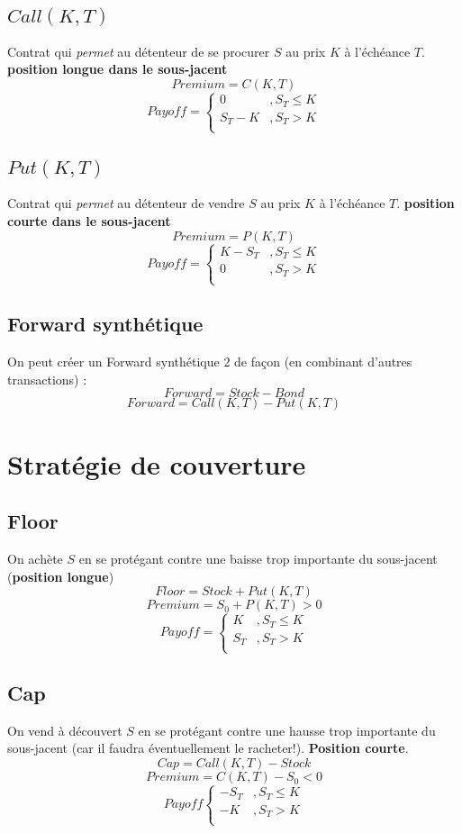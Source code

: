 \documentclass[10pt, french]{article}
\begin{document}
\begin{multicols*}{2}
\subsection*{$Call(K,T)$}
Contrat qui \textit{permet} au détenteur de se procurer $S$ au prix $K$ à l'échéance $T$. \textbf{position longue dans le sous-jacent}
\[Premium = C(K,T) \]
\[Payoff =
\begin{cases}
0				& , S_T \leq K \\
S_T - K		& , S_T > K \\
\end{cases}
\]



\subsection*{$Put(K,T)$}
Contrat qui \textit{permet} au détenteur de vendre $S$ au prix $K$ à l'échéance $T$. \textbf{position courte dans le sous-jacent}
\[Premium = P(K,T)\]
\[Payoff = 
\begin{cases}
K - S_T			& , S_T \leq K \\
0					& , S_T > K \\
\end{cases}
\]


\subsection*{Forward synthétique}
On peut créer un Forward synthétique 2 de façon (en combinant d'autres transactions) : 
\[Forward = Stock - Bond \]
\[Forward = Call(K,T) - Put(K,T) \]



\section{Stratégie de couverture}
\subsection*{Floor}
On achète $S$ en se protégant contre une baisse trop importante du sous-jacent (\textbf{position longue})
\[Floor = Stock + Put(K,T)\]
\[Premium = S_0 + P(K,T) > 0\]
\[Payoff = 
\begin{cases}
K					& , S_T \leq K \\
S_T				& , S_T > K \\
\end{cases}
\]


\subsection*{Cap}
On vend à découvert $S$ en se protégant contre une hausse trop importante du sous-jacent (car il faudra éventuellement le racheter!). \textbf{Position courte}.
\[Cap = Call(K,T) - Stock\]
\[Premium = C(K,T) - S_0 < 0\]
\[Payoff
\begin{cases}
- S_T 			& , S_T \leq K \\
- K				& , S_T > K \\
\end{cases}
\]



\end{multicols*}
\end{document}

